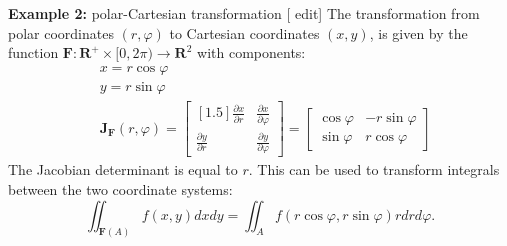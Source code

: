 \documentclass[14pt]{article}
\theoremstyle{definition}
\theoremstyle{remark}
\begin{document}
\textbf{Example 2:} polar-Cartesian transformation [ edit]
The transformation from polar coordinates $(r, \varphi)$ to Cartesian coordinates $(x, y)$, is given by the function $\mathbf{F}: \mathbf{R}^{+} \times[0,2 \pi) \rightarrow \mathbf{R}^2$ with components:
$$
    \begin{aligned}
         & x=r \cos \varphi                                                                                        \\
         & y=r \sin \varphi                                                                                        \\
         & \mathbf{J}_{\mathbf{F}}(r, \varphi)=\begin{bmatrix}[1.5]
                                                   \frac{\partial x}{\partial r} & \frac{\partial x}{\partial \varphi} \\
                                                   \frac{\partial y}{\partial r} & \frac{\partial y}{\partial \varphi}
                                               \end{bmatrix}=\left[\begin{array}{cc}
                                                                           \cos \varphi & -r \sin \varphi \\
                                                                           \sin \varphi & r \cos \varphi
                                                                       \end{array}\right]
    \end{aligned}
$$
The Jacobian determinant is equal to $r$. This can be used to transform integrals between the two coordinate systems:
$$
    \iint_{\mathbf{F}(A)} f(x, y) d x d y=\iint_A f(r \cos \varphi, r \sin \varphi) r d r d \varphi .
$$
\end{document}
